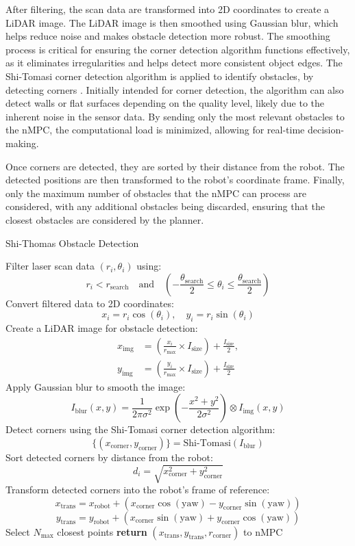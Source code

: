 \documentclass[conference]{IEEEtran}
\begin{document}
After filtering, the scan data are transformed into 2D coordinates to create a LiDAR image. The LiDAR image is then smoothed using Gaussian blur, which helps reduce noise and makes obstacle detection more robust. The smoothing process is critical for ensuring the corner detection algorithm functions effectively, as it eliminates irregularities and helps detect more consistent object edges. The Shi-Tomasi corner detection algorithm is applied to identify obstacles, by detecting corners \cite{GoodFeaturesToTrack}. Initially intended for corner detection, the algorithm can also detect walls or flat surfaces depending on the quality level, likely due to the inherent noise in the sensor data. By sending only the most relevant obstacles to the nMPC, the computational load is minimized, allowing for real-time decision-making.


Once corners are detected, they are sorted by their distance from the robot. The detected positions are then transformed to the robot's coordinate frame. Finally, only the maximum number of obstacles that the nMPC can process are considered, with any additional obstacles being discarded, ensuring that the closest obstacles are considered by the planner.

\begin{algorithm}
\caption{Shi-Thomas Obstacle Detection}
\label{alg:Obstacle_Detection_Algorithm}
\begin{algorithmic}[1]
\State Filter laser scan data $(r_i, \theta_i)$ using:
\[
r_i < r_{\text{search}} \quad \text{and} \quad \left( -\frac{\theta_{\text{search}}}{2} \leq \theta_i \leq \frac{\theta_{\text{search}}}{2} \right)
\]
\State Convert filtered data to 2D coordinates:
\[
x_i = r_i \cos(\theta_i), \quad y_i = r_i \sin(\theta_i)
\]
\State Create a LiDAR image for obstacle detection:
\begin{align*}
x_{\text{img}} &= \left( \frac{x_i}{r_{\text{max}}} \times I_{\text{size}} \right) + \frac{I_{\text{size}}}{2}, \\
y_{\text{img}} &= \left( \frac{y_i}{r_{\text{max}}} \times I_{\text{size}} \right) + \frac{I_{\text{size}}}{2}
\end{align*}
\State Apply Gaussian blur to smooth the image:
\[
I_{\text{blur}}(x, y) = \frac{1}{2\pi \sigma^2} \exp\left(-\frac{x^2 + y^2}{2\sigma^2}\right) \otimes I_{\text{img}}(x, y)
\]
\State Detect corners using the Shi-Tomasi corner detection algorithm:
\[
\{(x_{\text{corner}}, y_{\text{corner}})\} = \text{Shi-Tomasi}(I_{\text{blur}})
\]
\State Sort detected corners by distance from the robot:
\[
d_i = \sqrt{x_{\text{corner}}^2 + y_{\text{corner}}^2}
\]
\State Transform detected corners into the robot’s frame of reference:
\[
x_{\text{trans}} = x_{\text{robot}} + (x_{\text{corner}} \cos(\text{yaw}) - y_{\text{corner}} \sin(\text{yaw}))
\]
\[
y_{\text{trans}} = y_{\text{robot}} + (x_{\text{corner}} \sin(\text{yaw}) + y_{\text{corner}} \cos(\text{yaw}))
\]
\State Select $N_{\text{max}}$ closest points
\State \textbf{return} $(x_{\text{trans}}, y_{\text{trans}}, r_{\text{corner}})$ to nMPC
\end{algorithmic}
\end{algorithm}
\end{document}
